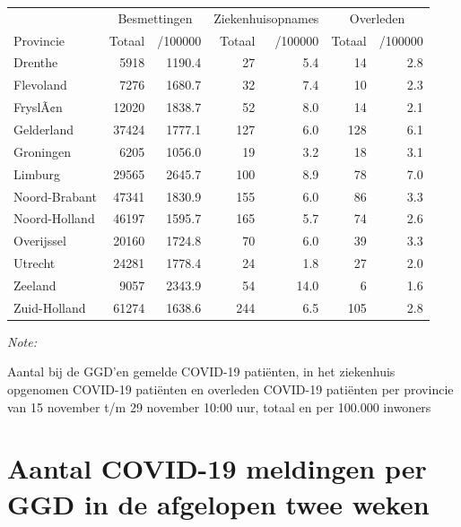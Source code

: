 \documentclass[
  english,
  man,floatsintext]{apa6}
\begin{document}
\begin{table}
\centering
\begin{threeparttable}
\begin{tabular}{lrrrrrr}
\toprule
\multicolumn{1}{c}{ } & \multicolumn{2}{c}{Besmettingen} & \multicolumn{2}{c}{Ziekenhuisopnames} & \multicolumn{2}{c}{Overleden} \\
\cmidrule(l{3pt}r{3pt}){2-3} \cmidrule(l{3pt}r{3pt}){4-5} \cmidrule(l{3pt}r{3pt}){6-7}
Provincie & Totaal & /100000 & Totaal & /100000 & Totaal & /100000\\
\midrule
Drenthe & 5918 & 1190.4 & 27 & 5.4 & 14 & 2.8\\
Flevoland & 7276 & 1680.7 & 32 & 7.4 & 10 & 2.3\\
FryslÃ¢n & 12020 & 1838.7 & 52 & 8.0 & 14 & 2.1\\
Gelderland & 37424 & 1777.1 & 127 & 6.0 & 128 & 6.1\\
Groningen & 6205 & 1056.0 & 19 & 3.2 & 18 & 3.1\\
Limburg & 29565 & 2645.7 & 100 & 8.9 & 78 & 7.0\\
Noord-Brabant & 47341 & 1830.9 & 155 & 6.0 & 86 & 3.3\\
Noord-Holland & 46197 & 1595.7 & 165 & 5.7 & 74 & 2.6\\
Overijssel & 20160 & 1724.8 & 70 & 6.0 & 39 & 3.3\\
Utrecht & 24281 & 1778.4 & 24 & 1.8 & 27 & 2.0\\
Zeeland & 9057 & 2343.9 & 54 & 14.0 & 6 & 1.6\\
Zuid-Holland & 61274 & 1638.6 & 244 & 6.5 & 105 & 2.8\\
\bottomrule
\end{tabular}
\begin{tablenotes}
\item \textit{Note: } 
\item Aantal bij de GGD’en gemelde COVID-19 patiënten, in het ziekenhuis opgenomen COVID-19 patiënten en overleden COVID-19 patiënten per provincie van 15 november t/m 29 november 10:00 uur, totaal en per 100.000 inwoners
\end{tablenotes}
\end{threeparttable}
\end{table}

\newpage

\hypertarget{aantal-covid-19-meldingen-per-ggd-in-de-afgelopen-twee-weken}{%
\section{Aantal COVID-19 meldingen per GGD in de afgelopen twee weken}\label{aantal-covid-19-meldingen-per-ggd-in-de-afgelopen-twee-weken}}
\end{document}
